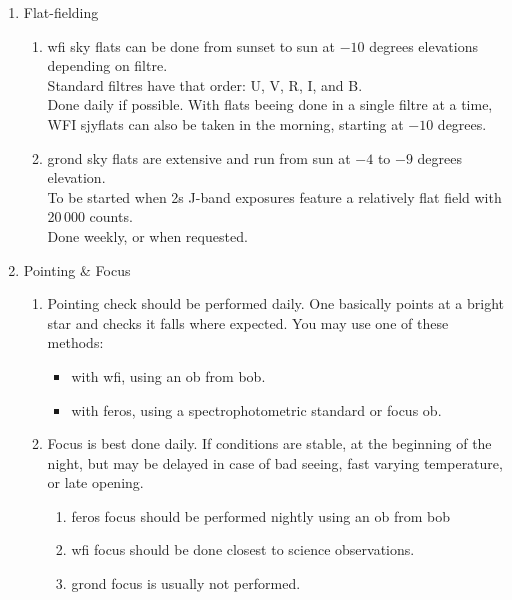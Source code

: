 \documentclass[11pt,fleqn,a4paper]{book}
\begin{document}
\begin{enumerate}
    \item Flat-fielding
    \begin{enumerate}
        \item \gls{wfi} \gls{sky flats} can be done from sunset to sun at $-10$ degrees elevations depending on filtre.\\
        Standard filtres have that order: U, V, R, I, and B.\\
        Done daily if possible. With flats beeing done in a single filtre at a time, WFI sjyflats can also be taken in the morning, starting at $-10$ degrees.
        \item \gls{grond} \gls{sky flats} are extensive and run from sun at $-4$ to $-9$ degrees elevation.\\
        To be started when 2s J-band exposures feature a
        relatively flat field with 20\,000 counts.\\
        Done weekly, or when requested.
    \end{enumerate}
    \item Pointing \& Focus
    \begin{enumerate}
        \item Pointing check should be performed daily.  One basically points at
        a bright star and checks it falls where expected.  You may use
        one of these methods:
        \begin{itemize} 
            \item with \gls{wfi}, using an \gls{ob} from \gls{bob}.
            \item with \gls{feros}, using a \gls{spectrophotometric standard} or \gls{focus} \gls{ob}.
        \end{itemize}
        \item Focus is best done daily.  If conditions are stable, at the beginning of the night, but may be delayed in case of bad seeing, fast varying temperature, or late opening.  
        \begin{enumerate}
            \item \gls{feros} \gls{focus} should be performed nightly using an \gls{ob} from \gls{bob}
            \item \gls{wfi} \gls{focus} should be done closest to science observations.
            \item \gls{grond} \gls{focus} is usually not performed.
        \end{enumerate}

\end{enumerate}
\end{enumerate}
\end{document}
